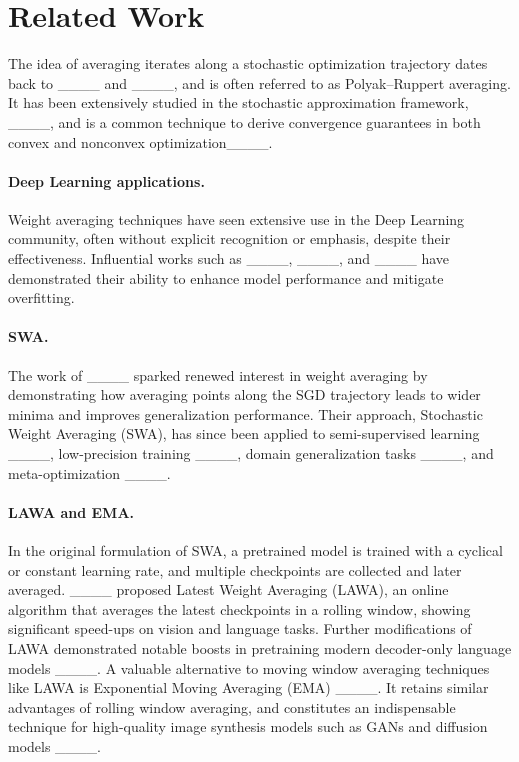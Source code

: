 \section{Related Work}
\label{sec:related_work}

The idea of averaging iterates along a stochastic optimization trajectory dates back to ____ and ____, and is often referred to as Polyak–Ruppert averaging.
It has been extensively studied in the stochastic approximation framework, ____, and is a common technique to derive convergence guarantees in both convex and nonconvex optimization____. 

\vspace{-2mm}
\paragraph{Deep Learning applications.}
Weight averaging techniques have seen extensive use in the Deep Learning community, often without explicit recognition or emphasis, despite their effectiveness. Influential works such as ____, ____, and ____ have demonstrated their ability to enhance model performance and mitigate overfitting.


\vspace{-2mm}
\paragraph{SWA.}
The work of ____ sparked renewed interest in weight averaging by demonstrating how averaging points along the SGD trajectory leads to wider minima and improves generalization performance. Their approach, Stochastic Weight Averaging (SWA), has since been applied to semi-supervised learning ____, low-precision training ____, domain generalization tasks ____, and meta-optimization ____.

\vspace{-2mm}
\paragraph{LAWA and EMA.} In the original formulation of SWA, a pretrained model is trained with a cyclical or constant learning rate, and multiple checkpoints are collected and later averaged.
____ proposed Latest Weight Averaging (LAWA), an online algorithm that averages the latest checkpoints in a rolling window, showing significant speed-ups on vision and language tasks. Further modifications of LAWA demonstrated notable boosts in pretraining modern decoder-only language models ____. %
A valuable alternative to moving window averaging techniques like LAWA is Exponential Moving Averaging (EMA) ____. It retains similar advantages of rolling window averaging, and constitutes an indispensable technique for high-quality image synthesis models such as GANs and diffusion models ____.

